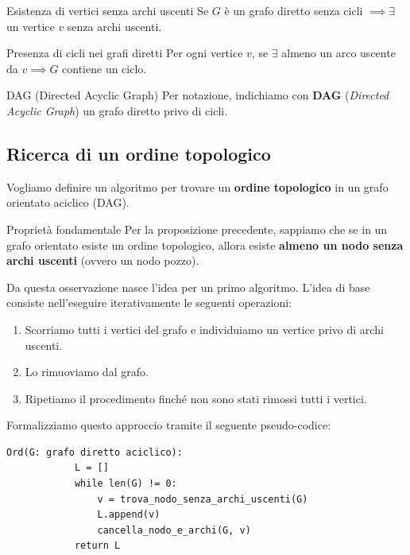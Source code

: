 \documentclass[12pt]{report}
\begin{document}
	\begin{proposizione}{Esistenza di vertici senza archi uscenti}{}
		Se $G$ è un grafo diretto senza cicli $\implies \exists$ un vertice $v$ senza archi uscenti.
	\end{proposizione}
	
	\begin{proposizione}{Presenza di cicli nei grafi diretti}{}
		Per ogni vertice $v$, se $\exists$ almeno un arco uscente da $v \implies G$ contiene un ciclo.
	\end{proposizione}
	
	\begin{definizione}{DAG (Directed Acyclic Graph)}{}
		Per notazione, indichiamo con \textbf{DAG} (\textit{Directed Acyclic Graph}) un grafo diretto privo di cicli.
	\end{definizione}
	
	\subsection{Ricerca di un ordine topologico}
	Vogliamo definire un algoritmo per trovare un \textbf{ordine topologico} in un grafo orientato aciclico (DAG).
	
	\begin{osservazione}{Proprietà fondamentale}{}
		Per la proposizione precedente, sappiamo che se in un grafo orientato esiste un ordine topologico, allora esiste \textbf{almeno un nodo senza archi uscenti} (ovvero un nodo pozzo).
	\end{osservazione}
	
	Da questa osservazione nasce l'idea per un primo algoritmo. L'idea di base consiste nell'eseguire iterativamente le seguenti operazioni:
	\begin{enumerate}
		\item Scorriamo tutti i vertici del grafo e individuiamo un vertice privo di archi uscenti.
		
		\item Lo rimuoviamo dal grafo.
		
		\item Ripetiamo il procedimento finché non sono stati rimossi tutti i vertici.
	\end{enumerate}
	
	Formalizziamo questo approccio tramite il seguente pseudo-codice:
	
	\begin{lstlisting}[style=stile-listings, caption={Algoritmo ingenuo per l'ordine topologico}]
		Ord(G: grafo diretto aciclico):
			L = []
			while len(G) != 0:
				v = trova_nodo_senza_archi_uscenti(G)
				L.append(v)
				cancella_nodo_e_archi(G, v)
			return L
	\end{lstlisting}
	
\end{document}

